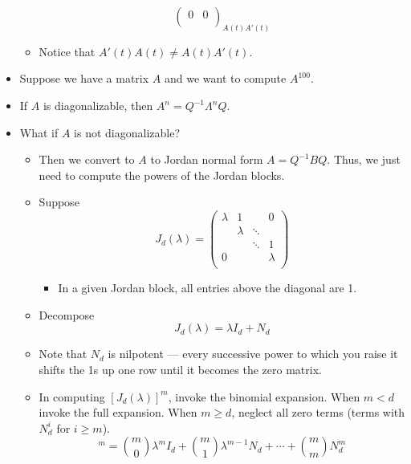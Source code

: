 \documentclass[../notes.tex]{subfiles}
\begin{document}
\begin{itemize}
\begin{itemize}
\begin{equation*}
{\begin{pmatrix}
                    0 & 0\\
                \end{pmatrix}
            }_{A(t)A'(t)}
        \end{equation*}
        \item Notice that $A'(t)A(t)\neq A(t)A'(t)$.
    \end{itemize}
    \item Suppose we have a matrix $A$ and we want to compute $A^{100}$.
    \item If $A$ is diagonalizable, then $A^n=Q^{-1}\Lambda^nQ$.
    \item What if $A$ is not diagonalizable?
    \begin{itemize}
        \item Then we convert to $A$ to Jordan normal form $A=Q^{-1}BQ$. Thus, we just need to compute the powers of the Jordan blocks.
        \item Suppose
        \begin{equation*}
            J_d(\lambda) =
            \begin{pmatrix}
                \lambda & 1 &  & 0\\
                 & \lambda & \ddots & \\
                 &  & \ddots & 1\\
                0 &  &  & \lambda\\
            \end{pmatrix}
        \end{equation*}
        \begin{itemize}
            \item In a given Jordan block, all entries above the diagonal are 1.
        \end{itemize}
        \item Decompose
        \begin{equation*}
            J_d(\lambda) = \lambda I_d+N_d
        \end{equation*}
        \item Note that $N_d$ is nilpotent --- every successive power to which you raise it shifts the 1s up one row until it becomes the zero matrix.
        \item In computing $[J_d(\lambda)]^m$, invoke the binomial expansion. When $m<d$ invoke the full expansion. When $m\geq d$, neglect all zero terms (terms with $N_d^i$ for $i\geq m$).
        \begin{equation*}
            [J_d(\lambda)]^m = \binom{m}{0}\lambda^mI_d+\binom{m}{1}\lambda^{m-1}N_d+\cdots+\binom{m}{m}N_d^m

\end{equation*}
\end{itemize}
\end{itemize}
\end{document}
